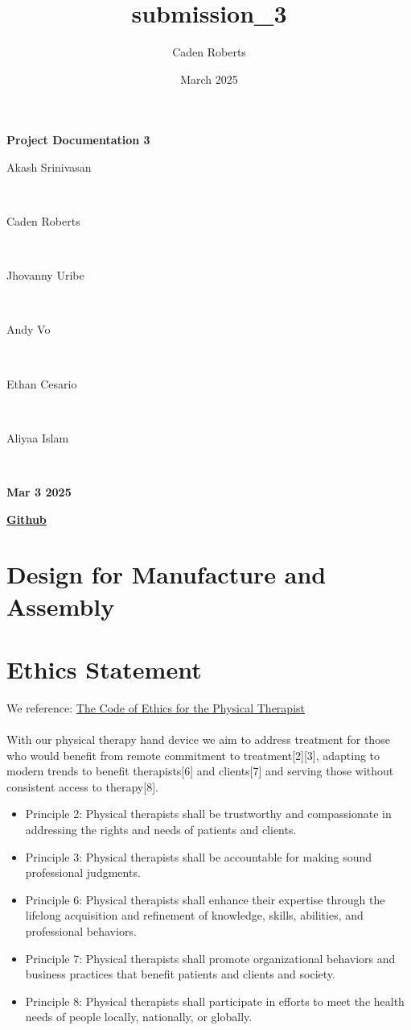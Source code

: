 \documentclass{article}
\title{submission_3}
\author{Caden Roberts}
\date{March 2025}
\begin{document}
\begin{titlepage}
    \centering
    \vfill
    {\Huge \bfseries Project Documentation 3\par}
    \vspace{1.5cm}
    {\Huge
        Akash Srinivasan \par \ \par
        Caden Roberts \par \ \par
        Jhovanny Uribe \par \ \par
        Andy Vo \par \ \par
        Ethan Cesario \par \ \par
        Aliyaa Islam \par \ \par
    }
    \vspace{1cm}
    {\Huge \bfseries Mar 3 2025\par}
    \vspace{1.5cm}
    \href{https://github.com/jhovuribe/Physical-Therapy-Hand-Rehabilitation-Device/}{\Huge \bfseries Github}
\end{titlepage}


\section{Design for Manufacture and Assembly}

\section{Ethics Statement}
We reference: \href{https://www.apta.org/siteassets/pdfs/policies/codeofethicshods06-20-28-25.pdf}{The Code of Ethics for the Physical Therapist} \\ \\ 
With our physical therapy hand device we aim to address treatment for those who would
benefit from remote commitment to treatment[2][3], adapting to modern trends to benefit
therapists[6] and clients[7] and serving those without consistent access to therapy[8].
\begin{itemize}
\item Principle 2: Physical therapists shall be trustworthy and compassionate in addressing the
rights and needs of patients and clients.
\item Principle 3: Physical therapists shall be accountable for making sound professional judgments.
\item Principle 6: Physical therapists shall enhance their expertise through the lifelong acquisition
and refinement of knowledge, skills, abilities, and professional behaviors.
\item Principle 7: Physical therapists shall promote organizational behaviors and business practices
that benefit patients and clients and society.
\item Principle 8: Physical therapists shall participate in efforts to meet the health needs of people locally, nationally, or globally.
\end{itemize}
\end{document}
